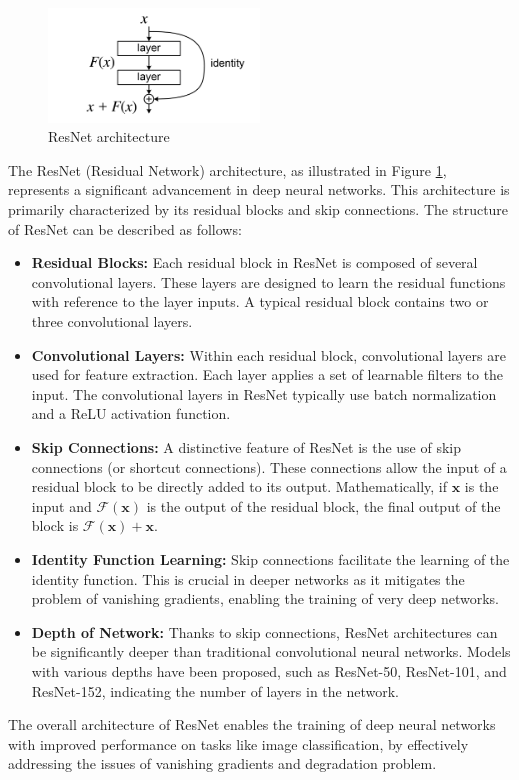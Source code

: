 \begin{figure}[h]
    \centering
    \includegraphics[width=0.5\textwidth]{figs/ResBlock.png}
    \caption{ResNet architecture}
    \label{fig:resnet}
\end{figure}

The ResNet (Residual Network) architecture, as illustrated in Figure \ref{fig:resnet}, represents a significant advancement in deep neural networks. This architecture is primarily characterized by its residual blocks and skip connections. The structure of ResNet can be described as follows:

\begin{itemize}
    \item \textbf{Residual Blocks:} Each residual block in ResNet is composed of several convolutional layers. These layers are designed to learn the residual functions with reference to the layer inputs. A typical residual block contains two or three convolutional layers.

    \item \textbf{Convolutional Layers:} Within each residual block, convolutional layers are used for feature extraction. Each layer applies a set of learnable filters to the input. The convolutional layers in ResNet typically use batch normalization and a ReLU activation function.

    \item \textbf{Skip Connections:} A distinctive feature of ResNet is the use of skip connections (or shortcut connections). These connections allow the input of a residual block to be directly added to its output. Mathematically, if $\mathbf{x}$ is the input and $\mathcal{F}(\mathbf{x})$ is the output of the residual block, the final output of the block is $\mathcal{F}(\mathbf{x}) + \mathbf{x}$.

    \item \textbf{Identity Function Learning:} Skip connections facilitate the learning of the identity function. This is crucial in deeper networks as it mitigates the problem of vanishing gradients, enabling the training of very deep networks.

    \item \textbf{Depth of Network:} Thanks to skip connections, ResNet architectures can be significantly deeper than traditional convolutional neural networks. Models with various depths have been proposed, such as ResNet-50, ResNet-101, and ResNet-152, indicating the number of layers in the network.
\end{itemize}

The overall architecture of ResNet enables the training of deep neural networks with improved performance on tasks like image classification, by effectively addressing the issues of vanishing gradients and degradation problem.



